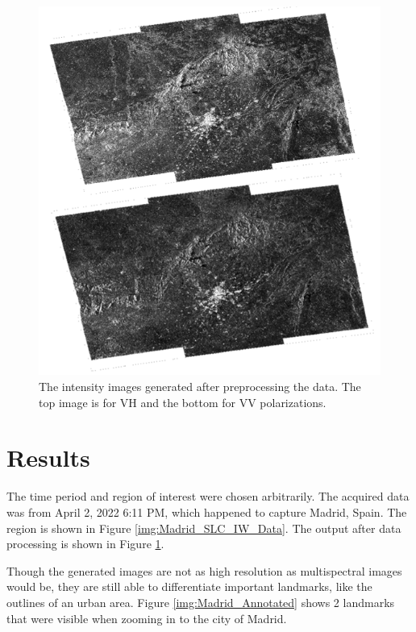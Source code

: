 \documentclass[conference]{IEEEtran}
\begin{document}
	\begin{figure}[htbp]
		\centerline{\includegraphics[scale=0.65]{Images/Data_Processed_Images.PNG}}
		\caption{The intensity images generated after preprocessing the data. The top image is for VH and the bottom for VV polarizations.}
		\label{img:Preprocessed_Images}
	\end{figure}

	\section{Results}
	The time period and region of interest were chosen arbitrarily. 
	The acquired data was from April 2, 2022 6:11 PM, which happened to capture Madrid, Spain. 
	The region is shown in Figure \ref{img:Madrid_SLC_IW_Data}. 
	The output after data processing is shown in Figure \ref{img:Preprocessed_Images}.
	
	Though the generated images are not as high resolution as multispectral images would be, 
	they are still able to differentiate important landmarks, like the outlines of an urban area.
	Figure \ref{img:Madrid_Annotated} shows 2 landmarks that were visible when zooming in to the city of Madrid.
	
\end{document}

